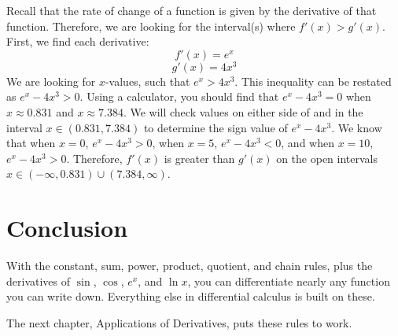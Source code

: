 \begin{Answer}[ref=deriv_rules11]
	Recall that the rate of change of a function is given by the 
	derivative of that function. Therefore, we are looking for the
	interval(s) where $f'(x) > g'(x)$. First, we find each derivative:
	$$f'(x) = e^x$$
	$$g'(x) = 4x^3$$
	We are looking for $x$-values, such that $e^x > 4x^3$. This inequality 
	can be restated as $e^x - 4x^3 > 0$. Using a calculator, you should 
	find that $e^x - 4x^3 = 0$ when $x \approx 0.831$ and $x \approx 
	7.384$. We will check values on either side of and in the interval 
	$x\in(0.831, 7.384)$ to determine the sign value of $e^x - 4x^3$. 
	We know that when $x = 0$, $e^x - 4x^3 > 0$, when $x = 5$, $e^x - 
	4x^3 < 0$, and when $x=10$, $e^x - 4x^3 > 0$. Therefore, $f'(x)$ is 
	greater than $g'(x)$ on the open intervals $x \in (-\infty, 0.831) 
	\cup (7.384, \infty)$.
\end{Answer}

\section{Conclusion}

With the constant, sum, power, product,
quotient, and chain rules, plus the derivatives of $\sin$, $\cos$, $e^x$,
and $\ln{x}$, you can differentiate nearly any function you can write
down. Everything else in differential calculus is built on these.

The next chapter, Applications of Derivatives, puts these rules to work.
